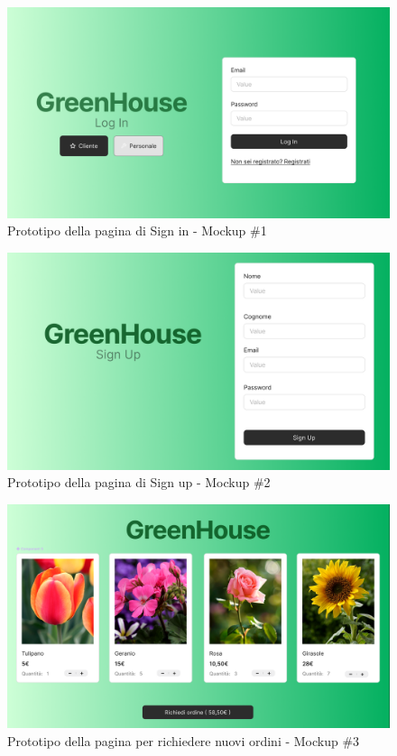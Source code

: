 \documentclass{article}
\begin{document}
\begin{figure}[H]
    \centering
    \includegraphics[scale=0.37]{resources/images/Mockups/mockup_1.png}
    \caption{Prototipo della pagina di Sign in - Mockup \#1}
    \label{fig:mockup_1}
\end{figure}
\begin{figure}[H]
    \centering
    \includegraphics[scale=0.35]{resources/images/Mockups/mockup_2.png}
    \caption{Prototipo della pagina di Sign up - Mockup \#2}
    \label{fig:mockup_2}
\end{figure}
\begin{figure}[H]
    \centering
    \includegraphics[scale=0.35]{resources/images/Mockups/mockup_3.png}
    \caption{Prototipo della pagina per richiedere nuovi ordini - Mockup \#3}
    \label{fig:mockup_3}
\end{figure}
\end{document}
